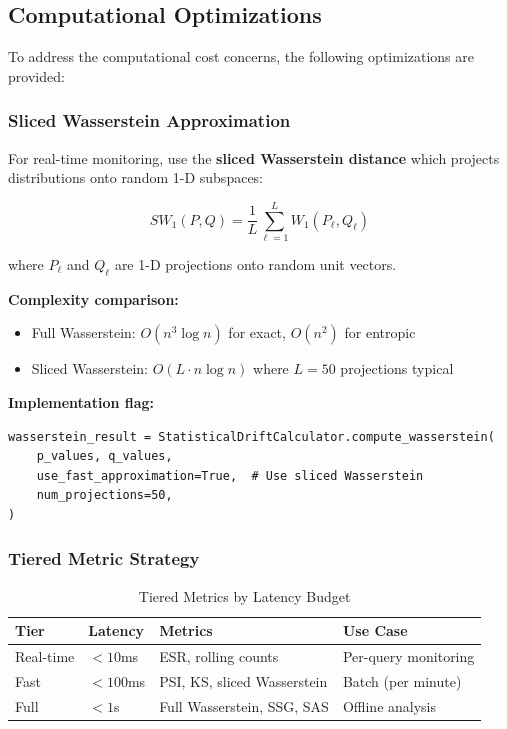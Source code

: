 \subsection{Computational Optimizations}

To address the computational cost concerns, the following optimizations are
provided:

\subsubsection{Sliced Wasserstein Approximation}

For real-time monitoring, use the \textbf{sliced Wasserstein distance} which
projects distributions onto random 1-D subspaces:

\begin{equation}
\boxed{
SW_1(P, Q) = \frac{1}{L} \sum_{\ell=1}^{L} W_1(P_\ell, Q_\ell)
}
\end{equation}

where $P_\ell$ and $Q_\ell$ are 1-D projections onto random unit vectors.

\textbf{Complexity comparison:}
\begin{itemize}
  \item Full Wasserstein: $O(n^3 \log n)$ for exact, $O(n^2)$ for entropic
  \item Sliced Wasserstein: $O(L \cdot n \log n)$ where $L=50$ projections typical
\end{itemize}

\textbf{Implementation flag:}
\begin{lstlisting}[language=jsonx]
wasserstein_result = StatisticalDriftCalculator.compute_wasserstein(
    p_values, q_values,
    use_fast_approximation=True,  # Use sliced Wasserstein
    num_projections=50,
)
\end{lstlisting}

\subsubsection{Tiered Metric Strategy}

\begin{table}[htbp]
\centering
\caption{Tiered Metrics by Latency Budget}
\label{tab:tiered-metrics}
\begin{tabular}{l l l l}
\toprule
\textbf{Tier} & \textbf{Latency} & \textbf{Metrics} & \textbf{Use Case} \\
\midrule
Real-time & $<10$ms & ESR, rolling counts & Per-query monitoring \\
Fast & $<100$ms & PSI, KS, sliced Wasserstein & Batch (per minute) \\
Full & $<1$s & Full Wasserstein, SSG, SAS & Offline analysis \\
\bottomrule
\end{tabular}
\end{table}

